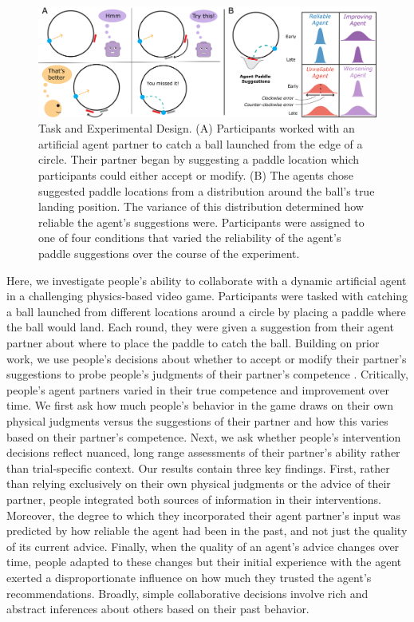 \documentclass[10pt,letterpaper]{article}
\begin{document}
\begin{figure}[hbtp]
\vspace{-8mm}
\includegraphics[width=\textwidth]{img/expt_overview_v3.jpg} 
\vspace{-4mm}
\caption{Task and Experimental Design. (A) Participants worked with an artificial agent partner to catch a ball launched from the edge of a circle. Their partner began by suggesting a paddle location which participants could either accept or modify. (B) The agents chose suggested paddle locations from a distribution around the ball's true landing position. The variance of this distribution determined how reliable the agent's suggestions were. Participants were assigned to one of four conditions that varied the reliability of the agent's paddle suggestions over the course of the experiment.} 
\label{fig:stimuli}
\end{figure}



Here, we investigate people's ability to collaborate with a dynamic artificial agent in a challenging physics-based video game. Participants were tasked with catching a ball launched from different locations around a circle by placing a paddle where the ball would land. Each round, they were given a suggestion from their agent partner about where to place the paddle to catch the ball. Building on prior work, we use people's decisions about whether to accept or modify their partner's suggestions to probe people's judgments of their partner's competence \cite{xie2019robot, chen2020trust}. Critically, people's agent partners varied in their true competence and improvement over time. We first ask how much people's behavior in the game draws on their own physical judgments versus the suggestions of their partner and how this varies based on their partner's competence. Next, we ask whether people's intervention decisions reflect nuanced, long range assessments of their partner's ability rather than trial-specific context. Our results contain three key findings. First, rather than relying exclusively on their own physical judgments or the advice of their partner, people integrated both sources of information in their interventions. Moreover, the degree to which they incorporated their agent partner's input was predicted by how reliable the agent had been in the past, and not just the quality of its current advice. Finally, when the quality of an agent's advice changes over time, people adapted to these changes but their initial experience with the agent exerted a disproportionate influence on how much they trusted the agent's recommendations. Broadly, simple collaborative decisions involve rich and abstract inferences about others based on their past behavior.
 
\end{document}
